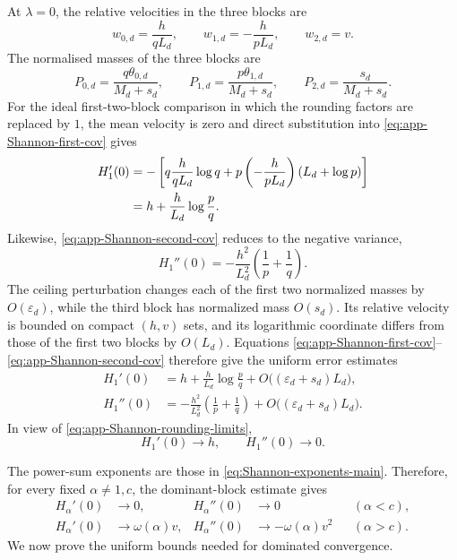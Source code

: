 \documentclass[aps,pra,11pt,onecolumn,nofootinbib,tightenlines]{revtex4-2}
\theoremstyle{definition}
\begin{document}
At $\lambda=0$, the relative velocities in the three blocks are
\begin{equation}
 w_{0,d}=\frac h{qL_d},
 \qquad
 w_{1,d}=-\frac h{pL_d},
 \qquad
 w_{2,d}=v.
 \label{eq:app-Shannon-block-velocities}
\end{equation}
The normalised masses of the three blocks are
\begin{equation}
 P_{0,d}=\frac{q\theta_{0,d}}{M_d+s_d},
 \qquad
 P_{1,d}=\frac{p\theta_{1,d}}{M_d+s_d},
 \qquad
 P_{2,d}=\frac{s_d}{M_d+s_d}.
 \label{eq:app-Shannon-block-masses}
\end{equation}
For the ideal first-two-block comparison in which the rounding factors are
replaced by $1$, the mean velocity is zero and direct substitution into
\eqref{eq:app-Shannon-first-cov} gives
\begin{align}
 H_1'(0)
 &=-\left[
 q\frac h{qL_d}\log q
 +p\left(-\frac h{pL_d}\right)(L_d+\log p)
 \right]
 \notag\\
 &=h+\frac h{L_d}\log\frac pq.
 \label{eq:app-Shannon-first-two-block-exact}
\end{align}
Likewise, \eqref{eq:app-Shannon-second-cov} reduces to the negative variance,
\begin{equation}
 H_1''(0)
 =-\frac{h^2}{L_d^2}
 \left(\frac1p+\frac1q\right).
 \label{eq:app-Shannon-second-two-block-exact}
\end{equation}
The ceiling perturbation changes each of the first two normalized masses by
$O(\varepsilon_d)$, while the third block has normalized mass $O(s_d)$.  Its
relative velocity is bounded on compact $(h,v)$ sets, and its logarithmic
coordinate differs from those of the first two blocks by $O(L_d)$.  Equations
\eqref{eq:app-Shannon-first-cov}--\eqref{eq:app-Shannon-second-cov} therefore
give the uniform error estimates
\begin{align}
 H_1'(0)
 &=h+\frac h{L_d}\log\frac pq
   +O\bigl((\varepsilon_d+s_d)L_d\bigr),
 \label{eq:app-Shannon-first-full}\\
 H_1''(0)
 &=-\frac{h^2}{L_d^2}
 \left(\frac1p+\frac1q\right)
   +O\bigl((\varepsilon_d+s_d)L_d\bigr).
 \label{eq:app-Shannon-second-full}
\end{align}
In view of \eqref{eq:app-Shannon-rounding-limits},
\begin{equation}
 H_1'(0)\longrightarrow h,
 \qquad
 H_1''(0)\longrightarrow0.
 \label{eq:app-Shannon-at-one-limit}
\end{equation}

The power-sum exponents are those in \eqref{eq:Shannon-exponents-main}.  Therefore, for every fixed $\alpha\neq1,c$, the dominant-block estimate gives
\begin{align}
 H_\alpha'(0)&\longrightarrow0,
 &H_\alpha''(0)&\longrightarrow0
 &&(\alpha<c),
 \label{eq:app-Shannon-pointwise-below}\\
 H_\alpha'(0)&\longrightarrow\omega(\alpha)v,
 &H_\alpha''(0)&\longrightarrow-\omega(\alpha)v^2
 &&(\alpha>c).
 \label{eq:app-Shannon-pointwise-above}
\end{align}
We now prove the uniform bounds needed for dominated convergence.
\end{document}
